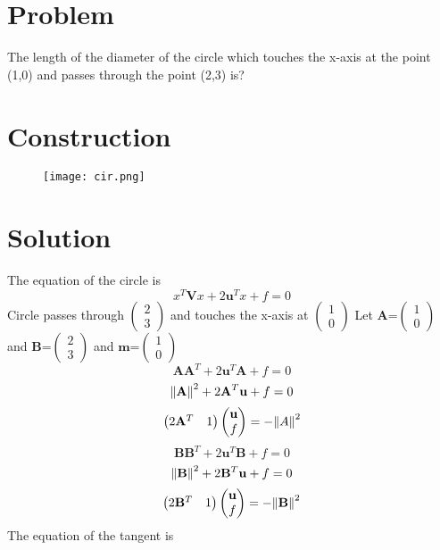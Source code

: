 \documentclass[10pt, a4paper]{article}
\title{\mytitle}
\author{\myauthor\hspace{1em}\\\contact\\FWC22012\hspace{6.5em}IITH\hspace{0.5em}\mymodule\hspace{6em}ASSIGN-5}
\date{}
\newcommand{\myvec}[1]{\ensuremath{\begin{pmatrix}#1\end{pmatrix}}}
\let\vec\mathbf
\begin{document}
	\maketitle
\section{Problem}
The length of the diameter of the circle which touches the x-axis at the point (1,0) and passes through the point (2,3) is?
\section{Construction}
\begin{figure}[h]
\texttt{[image: cir.png]} 
\end{figure}
\section{Solution}
The equation of the circle is 
\begin{equation}
	x^T\vec{V}x + 2\vec{u}^Tx + f = 0
\end{equation}
Circle passes through $\myvec{2\\3}$ and  touches the x-axis at $\myvec{1\\0}$ 
Let $\vec{A}$=$\myvec{1\\0}$ and $\vec{B}$=$\myvec{2\\3}$ and  $\vec{m}$=$\myvec{1\\0}$
\begin{equation}
	\vec{A}\vec{A}^T + 2\vec{u}^T\vec{A} + f = 0
\end{equation}
\begin{equation}
	\norm{\vec{A}}^2 + 2\vec{A}^T \vec{u} + f = 0
\end{equation}
\begin{equation}
	\myvec{2\vec{A}^T & 1}\myvec{\vec{u} \\ f} = -\norm{A}^2 
\end{equation}
\begin{equation}
	\vec{B}\vec{B}^T + 2\vec{u}^T\vec{B} + f = 0
\end{equation}
\begin{equation}
	\norm{\vec{B}}^2 + 2\vec{B}^T\vec{u} + f = 0
\end{equation}
\begin{equation}
	\myvec{2\vec{B}^T & 1}\myvec{\vec{u} \\ f} = -\norm{\vec{B}}^2
\end{equation}
The equation of the tangent is
\end{document}
